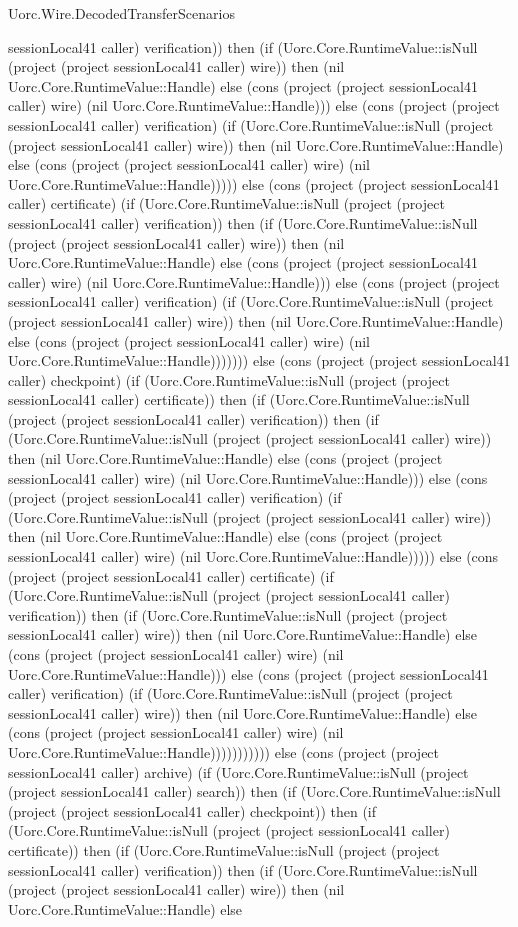 \begin{lexlean}{Uorc.Wire.DecodedTransferScenarios}
\begin{semanticmodule}
{sessionLocal41 caller) verification)) then (if (Uorc.Core.RuntimeValue::isNull (project (project sessionLocal41 caller) wire)) then (nil Uorc.Core.RuntimeValue::Handle) else (cons (project (project sessionLocal41 caller) wire) (nil Uorc.Core.RuntimeValue::Handle))) else (cons (project (project sessionLocal41 caller) verification) (if (Uorc.Core.RuntimeValue::isNull (project (project sessionLocal41 caller) wire)) then (nil Uorc.Core.RuntimeValue::Handle) else (cons (project (project sessionLocal41 caller) wire) (nil Uorc.Core.RuntimeValue::Handle))))) else (cons (project (project sessionLocal41 caller) certificate) (if (Uorc.Core.RuntimeValue::isNull (project (project sessionLocal41 caller) verification)) then (if (Uorc.Core.RuntimeValue::isNull (project (project sessionLocal41 caller) wire)) then (nil Uorc.Core.RuntimeValue::Handle) else (cons (project (project sessionLocal41 caller) wire) (nil Uorc.Core.RuntimeValue::Handle))) else (cons (project (project sessionLocal41 caller) verification) (if (Uorc.Core.RuntimeValue::isNull (project (project sessionLocal41 caller) wire)) then (nil Uorc.Core.RuntimeValue::Handle) else (cons (project (project sessionLocal41 caller) wire) (nil Uorc.Core.RuntimeValue::Handle))))))) else (cons (project (project sessionLocal41 caller) checkpoint) (if (Uorc.Core.RuntimeValue::isNull (project (project sessionLocal41 caller) certificate)) then (if (Uorc.Core.RuntimeValue::isNull (project (project sessionLocal41 caller) verification)) then (if (Uorc.Core.RuntimeValue::isNull (project (project sessionLocal41 caller) wire)) then (nil Uorc.Core.RuntimeValue::Handle) else (cons (project (project sessionLocal41 caller) wire) (nil Uorc.Core.RuntimeValue::Handle))) else (cons (project (project sessionLocal41 caller) verification) (if (Uorc.Core.RuntimeValue::isNull (project (project sessionLocal41 caller) wire)) then (nil Uorc.Core.RuntimeValue::Handle) else (cons (project (project sessionLocal41 caller) wire) (nil Uorc.Core.RuntimeValue::Handle))))) else (cons (project (project sessionLocal41 caller) certificate) (if (Uorc.Core.RuntimeValue::isNull (project (project sessionLocal41 caller) verification)) then (if (Uorc.Core.RuntimeValue::isNull (project (project sessionLocal41 caller) wire)) then (nil Uorc.Core.RuntimeValue::Handle) else (cons (project (project sessionLocal41 caller) wire) (nil Uorc.Core.RuntimeValue::Handle))) else (cons (project (project sessionLocal41 caller) verification) (if (Uorc.Core.RuntimeValue::isNull (project (project sessionLocal41 caller) wire)) then (nil Uorc.Core.RuntimeValue::Handle) else (cons (project (project sessionLocal41 caller) wire) (nil Uorc.Core.RuntimeValue::Handle))))))))))) else (cons (project (project sessionLocal41 caller) archive) (if (Uorc.Core.RuntimeValue::isNull (project (project sessionLocal41 caller) search)) then (if (Uorc.Core.RuntimeValue::isNull (project (project sessionLocal41 caller) checkpoint)) then (if (Uorc.Core.RuntimeValue::isNull (project (project sessionLocal41 caller) certificate)) then (if (Uorc.Core.RuntimeValue::isNull (project (project sessionLocal41 caller) verification)) then (if (Uorc.Core.RuntimeValue::isNull (project (project sessionLocal41 caller) wire)) then (nil Uorc.Core.RuntimeValue::Handle) else }
\end{semanticmodule}
\end{lexlean}
